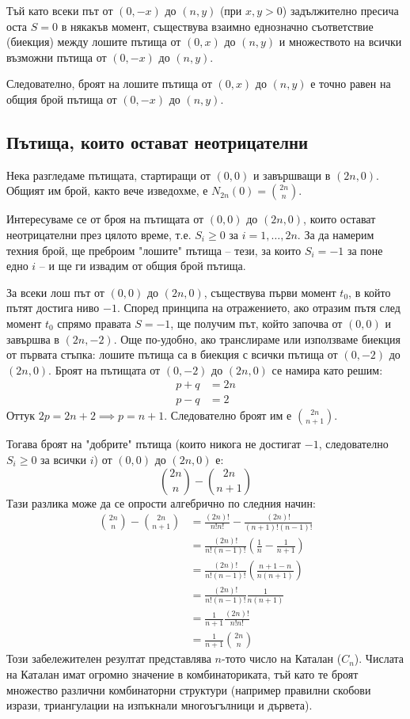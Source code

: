 \documentclass[12pt]{article}
\begin{document}
Тъй като всеки път от $(0,-x)$ до $(n,y)$ (при $x,y > 0$) задължително пресича оста $S=0$ в някакъв момент, съществува взаимно еднозначно съответствие (биекция) между лошите пътища от $(0,x)$ до $(n,y)$ и множеството на всички възможни пътища от $(0,-x)$ до $(n,y)$.

Следователно, броят на лошите пътища от $(0,x)$ до $(n,y)$ е точно равен на общия брой пътища от $(0,-x)$ до $(n,y)$.

\subsection{Пътища, които остават неотрицателни}
Нека разгледаме пътищата, стартиращи от $(0,0)$ и завършващи в $(2n, 0)$. Общият им брой, както вече изведохме, е $N_{2n}(0) = \binom{2n}{n}$.

Интересуваме се от броя на пътищата от $(0,0)$ до $(2n, 0)$, които остават неотрицателни през цялото време, т.е. $S_i \geq 0$ за $i=1, \dots, 2n$. 
За да намерим техния брой, ще преброим "лошите" пътища – тези, за които $S_i = -1$ за поне едно $i$ – и ще ги извадим от общия брой пътища.

За всеки лош път от $(0,0)$ до $(2n,0)$, съществува първи момент $t_0$, в който пътят достига ниво $-1$. Според принципа на отражението, ако отразим пътя след момент $t_0$ спрямо правата $S = -1$, ще получим път, който започва от $(0,0)$ и завършва в $(2n, -2)$. 
Още по-удобно, ако транслираме или използваме биекция от първата стъпка: лошите пътища са в биекция с всички пътища от $(0,-2)$ до $(2n,0)$.
Броят на пътищата от $(0,-2)$ до $(2n,0)$ се намира като решим:
\begin{align*}
p + q &= 2n \\
p - q &= 2
\end{align*}
Оттук $2p = 2n + 2 \implies p = n+1$. Следователно броят им е $\binom{2n}{n+1}$.

Тогава броят на "добрите" пътища (които никога не достигат $-1$, следователно $S_i \geq 0$ за всички $i$) от $(0,0)$ до $(2n,0)$ е:
\[ \binom{2n}{n} - \binom{2n}{n+1} \]
Тази разлика може да се опрости алгебрично по следния начин:
\begin{align*}
\binom{2n}{n} - \binom{2n}{n+1} &= \frac{(2n)!}{n!n!} - \frac{(2n)!}{(n+1)!(n-1)!} \\
&= \frac{(2n)!}{n!(n-1)!} \left( \frac{1}{n} - \frac{1}{n+1} \right) \\
&= \frac{(2n)!}{n!(n-1)!} \left( \frac{n+1 - n}{n(n+1)} \right) \\
&= \frac{(2n)!}{n!(n-1)!} \frac{1}{n(n+1)} \\
&= \frac{1}{n+1} \frac{(2n)!}{n!n!} \\
&= \frac{1}{n+1} \binom{2n}{n}
\end{align*}
Този забележителен резултат представлява $n$-тото число на Каталан ($C_n$). Числата на Каталан имат огромно значение в комбинаториката, тъй като те броят множество различни комбинаторни структури (например правилни скобови изрази, триангулации на изпъкнали многоъгълници и дървета).
\end{document}
